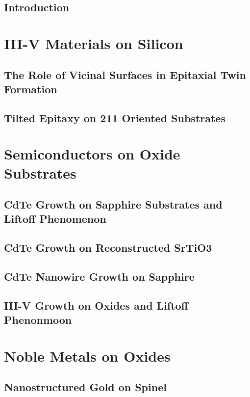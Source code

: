 \documentclass[letterpaper,10pt,twoside]{report}
\begin{document}


\chapter{Introduction}
%
\part{III-V Materials on Silicon}
\chapter{The Role of Vicinal Surfaces in Epitaxial Twin Formation}

\chapter{Tilted Epitaxy on 211 Oriented Substrates}

\part{Semiconductors on Oxide Substrates}
\chapter{CdTe Growth on Sapphire Substrates and Liftoff Phenomenon}

\chapter{CdTe Growth on Reconstructed SrTiO3}
%
\chapter{CdTe Nanowire Growth on Sapphire}
% 
\chapter{III-V Growth on Oxides and Liftoff Phenonmoon}
%
\part{Noble Metals on Oxides}
\chapter{Nanostructured Gold on Spinel}
%


\printbibliography
\end{document}
